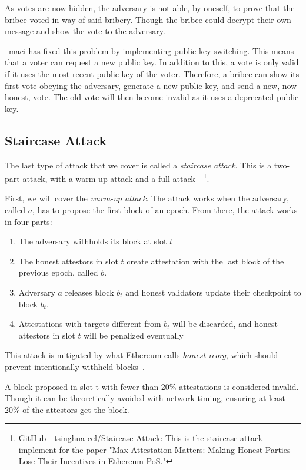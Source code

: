 As votes are now hidden, the adversary is not able, by oneself, to prove that the bribee voted in way of said bribery.
Though the bribee could decrypt their own message and show the vote to the adversary.

~\gls{maci} has fixed this problem by implementing public key switching.
This means that a voter can request a new public key.
In addition to this, a vote is only valid if it uses the most recent public key of the voter.
Therefore, a bribee can show its first vote obeying the adversary,
generate a new public key, and send a new, now honest, vote.
The old vote will then become invalid as it uses a deprecated public key.

\subsection{Staircase Attack}\label{subsec:staircase-attack}
The last type of attack that we cover is called a \textit{staircase attack}.
This is a two-part attack, with a warm-up attack and a full attack~\cite{cryptoeprint:2023/1622}~\footnote{
\href{https://github.com/tsinghua-cel/Staircase-Attack}{GitHub - tsinghua-cel/Staircase-Attack: This is the staircase attack implement for the paper "Max Attestation Matters: Making Honest Parties Lose Their Incentives in Ethereum PoS."}}.

First, we will cover the \textit{warm-up attack}.
The attack works when the adversary, called $a$, has to propose the first block of an epoch.
From there, the attack works in four parts:
\begin{enumerate}
    \item The adversary withholds its block at slot $t$
    \item The honest attestors in slot $t$ create attestation with the last block of the previous epoch, called $b$.
    \item Adversary $a$ releases block $b_t$ and honest validators update their checkpoint to block $b_t$.
    \item Attestations with targets different from $b_t$ will be discarded,
    and honest attestors in slot $t$ will be penalized eventually
\end{enumerate}

This attack is mitigated by what Ethereum calls \textit{honest reorg},
which should prevent intentionally withheld blocks~\cite{cryptoeprint:2023/1622}.

A block proposed in slot t with fewer than 20\% attestations is considered invalid.
Though it can be theoretically avoided with network timing, ensuring at least 20\% of the attestors get the block.



